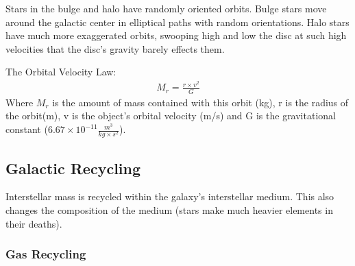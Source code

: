 \documentclass[12pt]{article}
\begin{document}
Stars in the bulge and halo have randomly oriented orbits. Bulge stars move around the galactic center in elliptical paths with random orientations. Halo stars have much more exaggerated orbits, swooping high and low the disc at such high velocities that the disc's gravity barely effects them.

The Orbital Velocity Law:\\
\begin{align*}
M_r = \frac{r \times v^2}{G}
\end{align*}
Where $M_r$ is the amount of mass contained with this orbit (kg), r is the radius of the orbit(m), v is the object's orbital velocity (m/s) and G is the gravitational constant ($6.67\times 10^{-11} \frac{m^3}{kg \times s^2}$).

\subsection{Galactic Recycling}
Interstellar mass is recycled within the galaxy's interstellar medium. This also changes the composition of the medium (stars make much heavier elements in their deaths).

\subsubsection{Gas Recycling}
\end{document}
